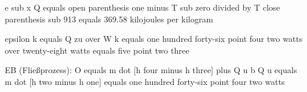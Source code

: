 e sub x Q equals open parenthesis one minus T sub zero divided by T close parenthesis sub 913 equals 369.58 kilojoules per kilogram

epsilon k equals Q zu over W k equals one hundred forty-six point four two watts over twenty-eight watts equals five point two three  
  
EB (Fließprozess):  
O equals m dot [h four minus h three] plus Q u  
b Q u equals m dot [h two minus h one] equals one hundred forty-six point four two watts